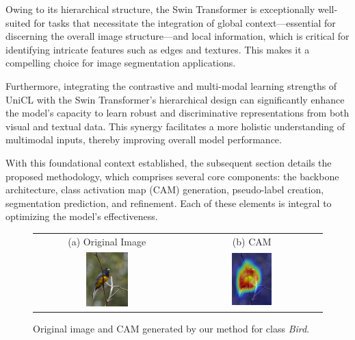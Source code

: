 Owing to its hierarchical structure, the Swin Transformer is exceptionally well-suited for tasks that necessitate the integration of global context—essential for discerning the overall image structure—and local information, which is critical for identifying intricate features such as edges and textures. This makes it a compelling choice for image segmentation applications.

Furthermore, integrating the contrastive and multi-modal learning strengths of UniCL with the Swin Transformer’s hierarchical design can significantly enhance the model’s capacity to learn robust and discriminative representations from both visual and textual data. This synergy facilitates a more holistic understanding of multimodal inputs, thereby improving overall model performance.

With this foundational context established, the subsequent section details the proposed methodology, which comprises several core components: the backbone architecture, class activation map (CAM) generation, pseudo-label creation, segmentation prediction, and refinement. Each of these elements is integral to optimizing the model’s effectiveness.


\begin{figure}[ht]
  \centering
  \setlength{\tabcolsep}{2pt} %
  \renewcommand{\arraystretch}{0.9}
    \centering
    \begin{tabular}{c c} %

    (a) Original Image & (b) CAM \\
    [1mm]
    \includegraphics[width=0.3\textwidth,height=0.3\textwidth]{figures/originals/2009_004084.jpg}
    & 
    \includegraphics[width=0.3\textwidth,height=0.3\textwidth]{figures/test_cams/ours/2009_004084_2.jpg}
    \\
  \end{tabular}

  \caption{Original image and CAM generated by our method for class \textit{Bird}.}
  \label{fig:cam_examples}
\end{figure}

